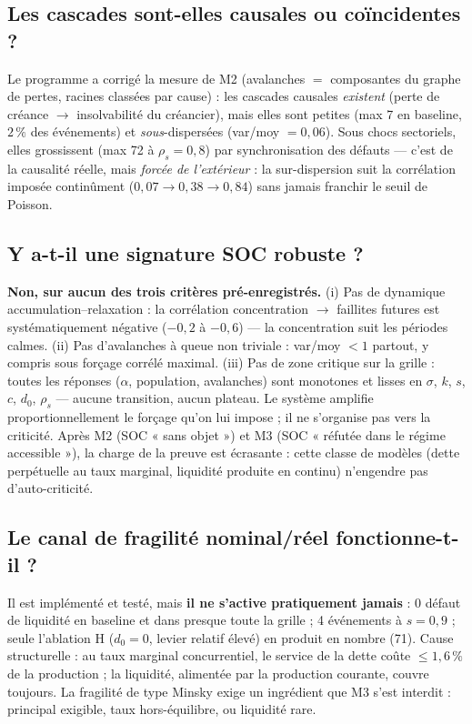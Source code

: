 \documentclass[11pt,a4paper]{article}
\begin{document}
\subsection{Les cascades sont-elles causales ou coïncidentes ?}
Le programme a corrigé la mesure de M2 (avalanches $=$ composantes du
graphe de pertes, racines classées par cause) : les cascades causales
\emph{existent} (perte de créance $\to$ insolvabilité du créancier),
mais elles sont petites (max 7 en baseline, $2\,\%$ des événements) et
\emph{sous}-dispersées (var/moy $= 0{,}06$). Sous chocs sectoriels, elles
grossissent (max 72 à $\rho_s = 0{,}8$) par synchronisation des défauts —
c'est de la causalité réelle, mais \emph{forcée de l'extérieur} : la
sur-dispersion suit la corrélation imposée continûment
($0{,}07 \to 0{,}38 \to 0{,}84$) sans jamais franchir le seuil de Poisson.

\subsection{Y a-t-il une signature SOC robuste ?}
\textbf{Non, sur aucun des trois critères pré-enregistrés.} (i) Pas de
dynamique accumulation--relaxation : la corrélation
concentration $\to$ faillites futures est systématiquement négative
($-0{,}2$ à $-0{,}6$) — la concentration suit les périodes calmes.
(ii) Pas d'avalanches à queue non triviale : var/moy $< 1$ partout, y
compris sous forçage corrélé maximal. (iii) Pas de zone critique sur la
grille : toutes les réponses ($\alpha$, population, avalanches) sont
monotones et lisses en $\sigma$, $k$, $s$, $c$, $d_0$, $\rho_s$ — aucune
transition, aucun plateau. Le système amplifie proportionnellement le
forçage qu'on lui impose ; il ne s'organise pas vers la criticité. Après
M2 (SOC « sans objet ») et M3 (SOC « réfutée dans le régime accessible »),
la charge de la preuve est écrasante : cette classe de modèles
(dette perpétuelle au taux marginal, liquidité produite en continu)
n'engendre pas d'auto-criticité.

\subsection{Le canal de fragilité nominal/réel fonctionne-t-il ?}
Il est implémenté et testé, mais \textbf{il ne s'active pratiquement
jamais} : 0 défaut de liquidité en baseline et dans presque toute la
grille ; 4 événements à $s = 0{,}9$ ; seule l'ablation H ($d_0 = 0$, levier
relatif élevé) en produit en nombre (71). Cause structurelle : au taux
marginal concurrentiel, le service de la dette coûte $\le 1{,}6\,\%$ de la
production ; la liquidité, alimentée par la production courante, couvre
toujours. La fragilité de type Minsky exige un ingrédient que M3 s'est
interdit : principal exigible, taux hors-équilibre, ou liquidité rare.
\end{document}
